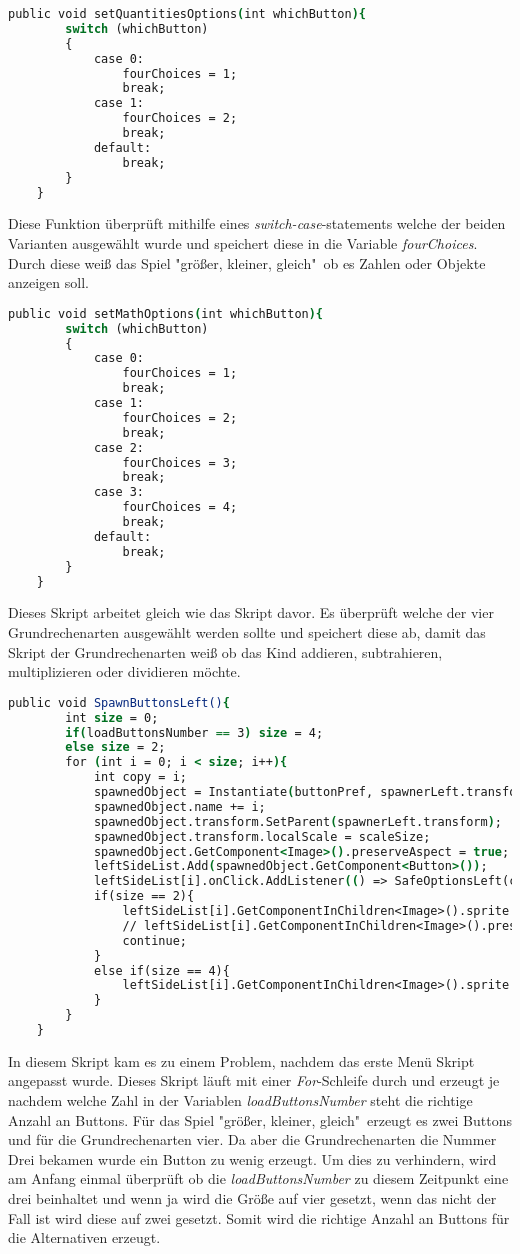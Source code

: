 \begin{lstlisting}[language=csh, caption={MenuPickLevelAdvanced.cs setQuantitiesOptions-Funktion}]
	public void setQuantitiesOptions(int whichButton){
		switch (whichButton)
		{
			case 0:
				fourChoices = 1;
				break;
			case 1:
				fourChoices = 2;
				break;
			default:
				break;
		}
	}
\end{lstlisting}
Diese Funktion überprüft mithilfe eines \textit{switch-case}-statements welche der beiden Varianten ausgewählt wurde und speichert diese in die Variable \textit{fourChoices}. Durch diese weiß das Spiel "größer, kleiner, gleich"\ ob es Zahlen oder Objekte anzeigen soll.
\begin{lstlisting}[language=csh, caption={MenuPickLevelAdvanced.cs setMathOptions-Funktion}]
	public void setMathOptions(int whichButton){
		switch (whichButton)
		{
			case 0:
				fourChoices = 1;
				break;
			case 1:
				fourChoices = 2;
				break;
			case 2:
				fourChoices = 3;
				break;
			case 3:
				fourChoices = 4;
				break;
			default:
				break;
		}
	}
\end{lstlisting}
Dieses Skript arbeitet gleich wie das Skript davor. Es überprüft welche der vier Grundrechenarten ausgewählt werden sollte und speichert diese ab, damit das Skript der Grundrechenarten weiß ob das Kind addieren, subtrahieren, multiplizieren oder dividieren möchte.
\begin{lstlisting}[language=csh, caption={MenuPickLevelAdvanced.cs SpawnButtonsLeft-Funktion}]
	public void SpawnButtonsLeft(){
		int size = 0;
		if(loadButtonsNumber == 3) size = 4;
		else size = 2;
		for (int i = 0; i < size; i++){
			int copy = i;
			spawnedObject = Instantiate(buttonPref, spawnerLeft.transform.position, Quaternion.identity);
			spawnedObject.name += i;
			spawnedObject.transform.SetParent(spawnerLeft.transform);
			spawnedObject.transform.localScale = scaleSize;
			spawnedObject.GetComponent<Image>().preserveAspect = true;
			leftSideList.Add(spawnedObject.GetComponent<Button>());
			leftSideList[i].onClick.AddListener(() => SafeOptionsLeft(copy));
			if(size == 2){
				leftSideList[i].GetComponentInChildren<Image>().sprite = quantitiesModes[i];
				// leftSideList[i].GetComponentInChildren<Image>().preserveAspect = true;
				continue;
			}
			else if(size == 4){
				leftSideList[i].GetComponentInChildren<Image>().sprite = mathModes[i];
			}
		}
	}
\end{lstlisting}
In diesem Skript kam es zu einem Problem, nachdem das erste Menü Skript angepasst wurde. Dieses Skript läuft mit einer \textit{For}-Schleife durch und erzeugt je nachdem welche Zahl in der Variablen \textit{loadButtonsNumber} steht die richtige Anzahl an Buttons. Für das Spiel "größer, kleiner, gleich"\ erzeugt es zwei Buttons und für die Grundrechenarten vier. Da aber die Grundrechenarten die Nummer Drei bekamen wurde ein Button zu wenig erzeugt. Um dies zu verhindern, wird am Anfang einmal überprüft ob die \textit{loadButtonsNumber} zu diesem Zeitpunkt eine drei beinhaltet und wenn ja wird die Größe auf vier gesetzt, wenn das nicht der Fall ist wird diese auf zwei gesetzt. Somit wird die richtige Anzahl an Buttons für die Alternativen erzeugt.\\
